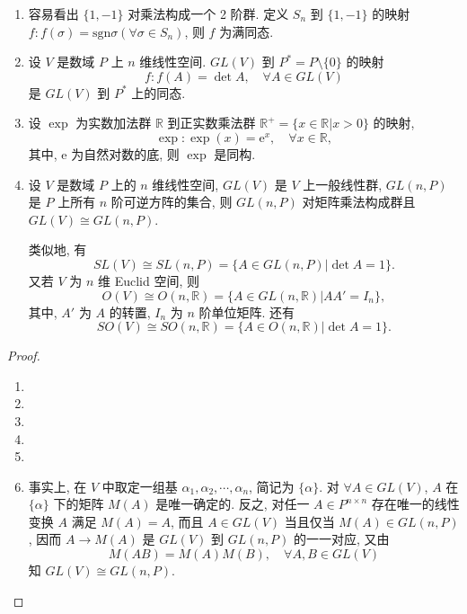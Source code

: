 \documentclass[../../main.tex]{subfiles}%
\begin{document}
\begin{example}
\begin{enumerate}[(1)]
\item 容易看出 \( \{1,-1\} \) 对乘法构成一个 2 阶群. 定义 \( S_n \) 到 \( \{1,-1\} \) 的映射 \( f: f(\sigma) = \text{sgn}\sigma (\forall \sigma \in S_n) \), 则 \( f \) 为满同态.

\item 设 \( V \) 是数域 \( P \) 上 \( n \) 维线性空间. \( GL(V) \) 到 \( P^* = P \setminus \{0\} \) 的映射
\[
f: f(A) = \det A, \quad \forall A \in GL(V)
\]
是 \( GL(V) \) 到 \( P^* \) 上的同态.

\item 设 \( \exp \) 为实数加法群 \( \mathbb{R} \) 到正实数乘法群 \( \mathbb{R}^+ = \{x \in \mathbb{R}|x > 0\} \) 的映射,
\[
\exp: \exp(x) = \text{e}^x, \quad \forall x \in \mathbb{R},
\]
其中, \( \text{e} \) 为自然对数的底, 则 \( \exp \) 是同构.

\item 设 \( V \) 是数域 \( P \) 上的 \( n \) 维线性空间, \( GL(V) \) 是 \( V \) 上一般线性群, \( GL(n,P) \) 是 \( P \) 上所有 \( n \) 阶可逆方阵的集合, 则 \( GL(n,P) \) 对矩阵乘法构成群且 \( GL(V) \cong GL(n,P) \).

类似地, 有
\[
SL(V) \cong SL(n,P) = \{A \in GL(n,P)|\det A = 1\}.
\]
又若 \( V \) 为 \( n \) 维 Euclid 空间, 则
\[
O(V) \cong O(n,\mathbb{R}) = \{A \in GL(n,\mathbb{R})|AA' = I_n\},
\]
其中, \( A' \) 为 \( A \) 的转置, \( I_n \) 为 \( n \) 阶单位矩阵. 还有
\[
SO(V) \cong SO(n,\mathbb{R}) = \{A \in O(n,\mathbb{R})|\det A = 1\}.
\]
\end{enumerate}
\end{example}
\begin{proof}
\begin{enumerate}
\item 

\item 

\item 

\item 

\item 

\item 事实上, 在 \( V \) 中取定一组基 \( \alpha_1,\alpha_2,\cdots,\alpha_n \), 简记为 \( \{\alpha\} \). 对 \( \forall A \in GL(V) \), \( A \) 在 \( \{\alpha\} \) 下的矩阵 \( M(A) \) 是唯一确定的. 反之, 对任一 \( A \in P^{n \times n} \) 存在唯一的线性变换 \( A \) 满足 \( M(A) = A \), 而且 \( A \in GL(V) \) 当且仅当 \( M(A) \in GL(n,P) \), 因而 \( A \to M(A) \) 是 \( GL(V) \) 到 \( GL(n,P) \) 的一一对应, 又由
\[
M(AB) = M(A)M(B), \quad \forall A,B \in GL(V)
\]
知 \( GL(V) \cong GL(n,P) \).
\end{enumerate}
\end{proof}
\end{document}
